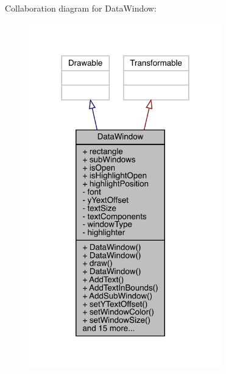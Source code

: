 Collaboration diagram for Data\+Window\+:
\nopagebreak
\begin{figure}[H]
\begin{center}
\leavevmode
\includegraphics[width=236pt]{df/db7/class_data_window__coll__graph}
\end{center}
\end{figure}
